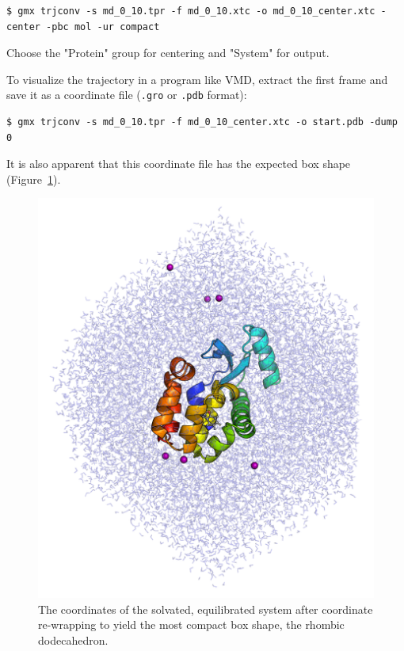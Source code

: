 \documentclass[9pt,tutorial,pubversion]{livecoms}
\begin{document}
\begin{lstlisting}
$ gmx trjconv -s md_0_10.tpr -f md_0_10.xtc -o md_0_10_center.xtc -center -pbc mol -ur compact
\end{lstlisting}

Choose the "Protein" group for centering  and "System" for output.

To visualize the trajectory in a program like VMD, extract the first frame and save it as a coordinate file (\texttt{.gro} or \texttt{.pdb} format):

\begin{lstlisting}
$ gmx trjconv -s md_0_10.tpr -f md_0_10_center.xtc -o start.pdb -dump 0
\end{lstlisting}

It is also apparent that this coordinate file has the expected box shape (Figure~\ref{3htb_t0_rewrap_fig}).

\begin{figure}[h!]
\centering
\includegraphics{3htb_t0_rewrap}
\caption{The coordinates of the solvated, equilibrated system after coordinate re-wrapping to yield the most compact box shape, the rhombic dodecahedron.}
\label{3htb_t0_rewrap_fig}
\end{figure}
\end{document}
